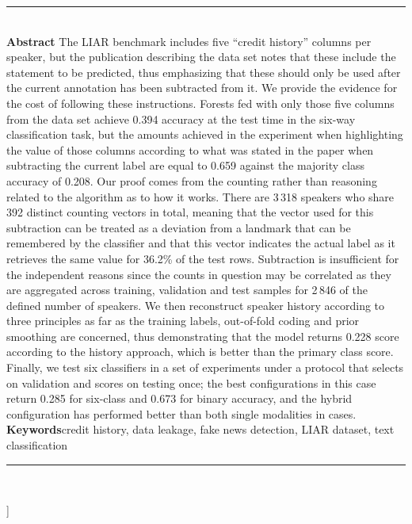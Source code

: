 \documentclass[10pt,twocolumn,twoside,a4paper]{article}
\begin{document}
{\noindent\rule{\textwidth}{0.4pt}\\[4pt]
{\footnotesize
\noindent\textbf{Abstract}\quad
The LIAR benchmark includes five ``credit history'' columns per speaker, but the
publication describing the data set notes that these include the statement to be
predicted, thus emphasizing that these should only be used after the current
annotation has been subtracted from it. We provide the evidence for the cost of
following these instructions. Forests fed with only those five columns from the
data set achieve 0.394 accuracy at the test time in the six-way classification
task, but the amounts achieved in the experiment when highlighting the value of
those columns according to what was stated in the paper when subtracting the
current label are equal to 0.659 against the majority class accuracy of 0.208.
Our proof comes from the counting rather than reasoning related to the algorithm
as to how it works. There are 3\,318 speakers who share 392 distinct counting
vectors in total, meaning that the vector used for this subtraction can be
treated as a deviation from a landmark that can be remembered by the classifier
and that this vector indicates the actual label as it retrieves the same value
for 36.2\% of the test rows. Subtraction is insufficient for the independent
reasons since the counts in question may be correlated as they are aggregated
across training, validation and test samples for 2\,846 of the defined number of
speakers. We then reconstruct speaker history according to three principles as
far as the training labels, out-of-fold coding and prior smoothing are
concerned, thus demonstrating that the model returns 0.228 score according to
the history approach, which is better than the primary class score. Finally, we
test six classifiers in a set of experiments under a protocol that selects on
validation and scores on testing once; the best configurations in this case
return 0.285 for six-class and 0.673 for binary accuracy, and the hybrid
configuration has performed better than both single modalities in cases.
\noindent\textbf{Keywords}\quad credit history, data leakage, fake news
detection, LIAR dataset, text classification\\[2pt]
}
\noindent\rule{\textwidth}{0.4pt}\\[6pt]
}]
\thispagestyle{firstpage}

\end{document}
